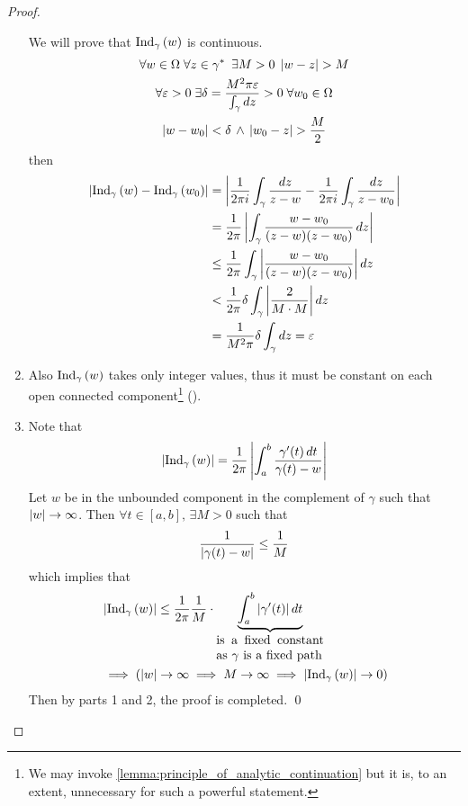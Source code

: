 \documentclass[11pt, oneside]{book}
\begin{document}
\begin{proof}
\begin{enumerate}
		We will prove that $\operatorname{Ind}_{\gamma}\left( w \right)$ is continuous.
		\begin{gather*}
			\forall w \in \Omega \; \forall z \in \gamma^* \enspace \exists M > 0 \; \left|w - z\right| > M \\
			\forall \varepsilon > 0 \; \exists \delta = \frac{M^2 \pi \varepsilon}{ \int_{\gamma} \mathop{}\!d{z} } > 0 \; \forall w_0 \in \Omega \\
			\left|w - w_0\right| < \delta \, \land \, \left|w_0 - z\right| > \frac{M}{2}
		\end{gather*}
		then
		\begin{align*}
			\left|\operatorname{Ind}_{\gamma}\left( w \right) - \operatorname{Ind}_{\gamma}\left( w_0 \right)\right| &= \left|\frac{1}{2 \pi i} \int_{\gamma} \frac{\mathop{}\!d{z}}{z - w}	- \frac{1}{2 \pi i} \int_{\gamma} \frac{\mathop{}\!d{z}}{z - w_0} \right| \\
				&= \frac{1}{2 \pi} \left|\int_{\gamma} \frac{w - w_0}{(z - w)(z - w_0)} \mathop{}\!d{z} \right| \\
				&\leq \frac{1}{2 \pi} \int_{\gamma} \left|\frac{w - w_0}{(z - w)(z - w_0)} \right| \mathop{}\!d{z} \\
				&< \frac{1}{2 \pi} \delta \int_{\gamma} \left|\frac{2}{M \cdot M} \right| \mathop{}\!d{z} \\
				&= \frac{1}{M^2 \pi} \delta \int_{\gamma} \mathop{}\!d{z} = \varepsilon
		\end{align*}

		\item Also $\operatorname{Ind}_{\gamma}\left( w \right)$ takes only integer values, thus it must be constant on each open connected component\footnote{We may invoke \cref{lemma:principle_of_analytic_continuation} but it is, to an extent, unnecessary for such a powerful statement.} ().

		\item Note that
		\begin{equation*}
			\left|\operatorname{Ind}_{\gamma}\left( w \right)\right| = \frac{1}{2 \pi} \left|\int_{a}^{b} \frac{\gamma'(t) \mathop{}\!d{t}}{\gamma(t) - w}\right|
		\end{equation*}
		Let $w$ be in the unbounded component in the complement of $\gamma$ such that $\left|w\right| \to \infty$. Then $\forall t \in [a, b], \, \exists M > 0$ such that
		\begin{equation*}
			\frac{1}{\left|\gamma(t) - w\right|} \leq \frac{1}{M}
		\end{equation*}
		which implies that
		\begin{align*}
			&\abs{\ind{w}{\gamma}} \leq \frac{1}{2 \pi} \frac{1}{M} \cdot \underbrace{\int_{a}^{b} \abs{\gamma'(t)} \dif{t}}_{\parbox{3cm}{is a fixed constant as $\gamma$ is a fixed path}} \\
			&\implies (\abs{w} \to \infty \implies M \to \infty \implies \abs{\ind{w}{\gamma}} \to 0)
		\end{align*}
		Then by parts 1 and 2, the proof is completed. \qed
	\end{enumerate}
\end{proof}
\end{document}
